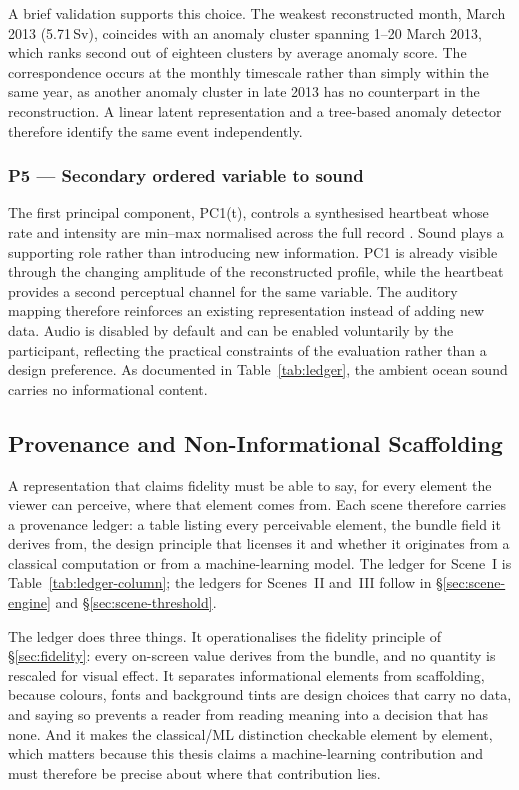 A brief validation supports this choice. The weakest reconstructed month, March 2013 (5.71\,Sv), coincides with an anomaly cluster spanning 1--20 March 2013, which ranks second out of eighteen clusters by average anomaly score. The correspondence occurs at the monthly timescale rather than simply within the same year, as another anomaly cluster in late 2013 has no counterpart in the reconstruction. A linear latent representation and a tree-based anomaly detector therefore identify the same event independently.

\subsubsection*{P5 --- Secondary ordered variable to sound}

The first principal component, PC1(t), controls a synthesised heartbeat whose rate and intensity are min--max normalised across the full record \parencite{hermann2011}. Sound plays a supporting role rather than introducing new information. PC1 is already visible through the changing amplitude of the reconstructed profile, while the heartbeat provides a second perceptual channel for the same variable. The auditory mapping therefore reinforces an existing representation instead of adding new data. Audio is disabled by default and can be enabled voluntarily by the participant, reflecting the practical constraints of the evaluation rather than a design preference. As documented in Table~\ref{tab:ledger}, the ambient ocean sound carries no informational content.

\subsection{Provenance and Non-Informational Scaffolding}
\label{subsec:provenance}

A representation that claims fidelity must be able to say, for every element the
viewer can perceive, where that element comes from. Each scene therefore carries
a provenance ledger: a table listing every perceivable element, the bundle field
it derives from, the design principle that licenses it and whether it originates
from a classical computation or from a machine-learning model. The ledger for
Scene~I is Table~\ref{tab:ledger-column}; the ledgers for Scenes~II and~III
follow in \S\ref{sec:scene-engine} and \S\ref{sec:scene-threshold}.

The ledger does three things. It operationalises the fidelity principle of
\S\ref{sec:fidelity}: every on-screen value derives from the bundle, and no
quantity is rescaled for visual effect. It separates informational elements from
scaffolding, because colours, fonts and background tints are design choices that
carry no data, and saying so prevents a reader from reading meaning into a
decision that has none. And it makes the classical/ML distinction checkable
element by element, which matters because this thesis claims a machine-learning
contribution and must therefore be precise about where that contribution lies.

